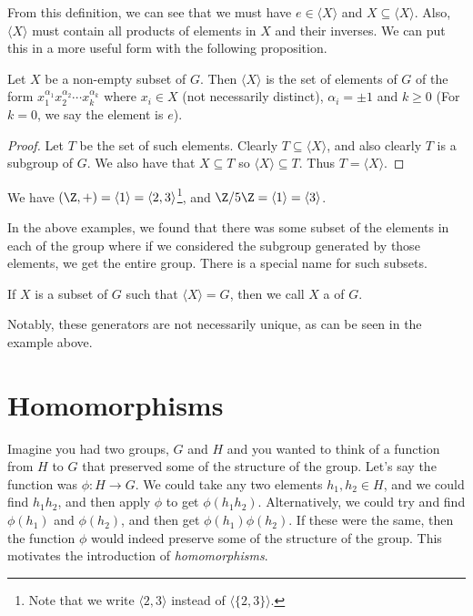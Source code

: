 \documentclass[a4]{scrreprt}
\begin{document}
From this definition, we can see that we must have $e \in \langle X \rangle$ and $X \subseteq \langle X\rangle$. Also, $\langle X \rangle$ must contain all products of elements in $X$ and their inverses.
We can put this in a more useful form with the following proposition.

\begin{proposition}
	Let $X$ be a non-empty subset of $G$. Then $\langle X \rangle$ is the set of elements of $G$ of the form 
	$x_1^{\alpha_1} x_2^{\alpha_2} \cdots x_k^{\alpha_k}$ where $x_i \in X$ (not necessarily distinct), $\alpha_i = \pm 1$ and $k \geq 0$
	(For $k = 0$, we say the element is $e$).
\end{proposition}
\begin{proof}
	Let $T$ be the set of such elements. Clearly $T \subseteq \langle X \rangle$, and also clearly $T$ is a subgroup of $G$. We also have that $X \subseteq T$ so $\langle X \rangle \subseteq T$. Thus $T = \langle X \rangle$.
\end{proof}
  
\begin{example}
	We have $(\Z, +) = \langle 1 \rangle = \langle 2, 3 \rangle$\footnote{Note that we write $\langle 2, 3\rangle$ instead of $\langle \{2, 3\} \rangle$.}, and $\Z/5\Z = \langle 1 \rangle = \langle 3 \rangle$.
\end{example}

In the above examples, we found that there was some subset of the elements in each of the group where if we considered the subgroup generated by those elements, we get the entire group.
There is a special name for such subsets.

\begin{definition}[Generators]\label{def:generator}
	If $X$ is a subset of $G$ such that $\langle X \rangle = G$, then we call $X$ a  of $G$.
\end{definition}

Notably, these generators are not necessarily unique, as can be seen in the example above.


\section{Homomorphisms}

Imagine you had two groups, $G$ and $H$ and you wanted to think of a function from $H$ to $G$ that preserved some of the structure of the group.
Let's say the function was $\phi : H \rightarrow G$. We could take any two elements $h_1, h_2 \in H$, and we could find $h_1 h_2$, and then apply $\phi$ to get $\phi(h_1 h_2)$.
Alternatively, we could try and find $\phi(h_1)$ and $\phi(h_2)$, and then get $\phi(h_1) \phi(h_2)$. If these were the same, then the function $\phi$ would indeed preserve some of the structure of the group. This motivates the introduction of \emph{homomorphisms}.
\end{document}

